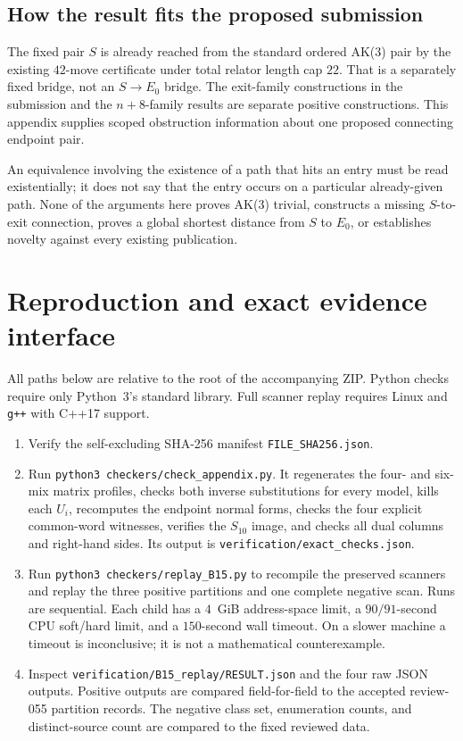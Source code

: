 \documentclass[11pt,a4paper]{article}
\theoremstyle{definition}\newtheorem{definition}[theorem]{Definition}
\theoremstyle{remark}\newtheorem{remark}[theorem]{Remark}
\newcommand{\word}[1]{\texttt{#1}}
\newcommand{\pathfile}[1]{\nolinkurl{#1}}
\begin{document}
\subsection{How the result fits the proposed submission}
The fixed pair $S$ is already reached from the standard ordered AK(3) pair by the existing $42$-move certificate under total relator length cap $22$. That is a separately fixed bridge, not an $S\to E_0$ bridge. The exit-family constructions in the submission and the $n+8$-family results are separate positive constructions. This appendix supplies scoped obstruction information about one proposed connecting endpoint pair.

An equivalence involving the existence of a path that hits an entry must be read existentially; it does not say that the entry occurs on a particular already-given path. None of the arguments here proves AK(3) trivial, constructs a missing $S$-to-exit connection, proves a global shortest distance from $S$ to $E_0$, or establishes novelty against every existing publication.

\section{Reproduction and exact evidence interface}\label{sec:reproduce}
All paths below are relative to the root of the accompanying ZIP. Python checks require only Python~3's standard library. Full scanner replay requires Linux and \word{g++} with C++17 support.

\begin{enumerate}
\item Verify the self-excluding SHA-256 manifest \pathfile{FILE_SHA256.json}.
\item Run \word{python3}\ \pathfile{checkers/check_appendix.py}. It regenerates the four- and six-mix matrix profiles, checks both inverse substitutions for every model, kills each $U_i$, recomputes the endpoint normal forms, checks the four explicit common-word witnesses, verifies the $S_{10}$ image, and checks all dual columns and right-hand sides. Its output is \pathfile{verification/exact_checks.json}.
\item Run \word{python3}\ \pathfile{checkers/replay_B15.py} to recompile the preserved scanners and replay the three positive partitions and one complete negative scan. Runs are sequential. Each child has a $4$~GiB address-space limit, a $90/91$-second CPU soft/hard limit, and a $150$-second wall timeout. On a slower machine a timeout is inconclusive; it is not a mathematical counterexample.
\item Inspect \pathfile{verification/B15_replay/RESULT.json} and the four raw JSON outputs. Positive outputs are compared field-for-field to the accepted review-055 partition records. The negative class set, enumeration counts, and distinct-source count are compared to the fixed reviewed data.
\end{enumerate}
\end{document}
